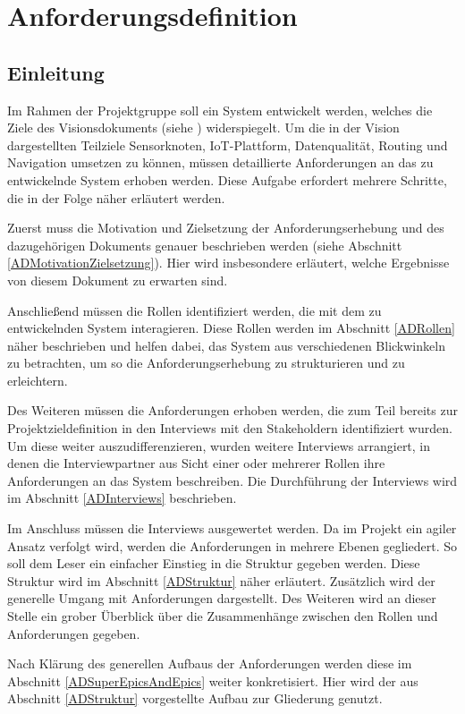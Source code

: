 \chapter{Anforderungsdefinition}\label{AD}
\section{Einleitung}\label{ADEinleitung}
Im Rahmen der Projektgruppe soll ein System entwickelt werden, welches die Ziele des Visionsdokuments (siehe ) widerspiegelt. Um die in der Vision dargestellten Teilziele Sensorknoten, IoT-Plattform, Datenqualität, Routing und Navigation umsetzen zu können, müssen detaillierte Anforderungen an das zu entwickelnde System erhoben werden. Diese Aufgabe erfordert mehrere Schritte, die in der Folge näher erläutert werden.

Zuerst muss die Motivation und Zielsetzung der Anforderungserhebung und des dazugehörigen Dokuments genauer beschrieben werden (siehe Abschnitt \ref{ADMotivationZielsetzung}). Hier wird insbesondere erläutert, welche Ergebnisse von diesem Dokument zu erwarten sind.

Anschließend müssen die Rollen identifiziert werden, die mit dem zu entwickelnden System interagieren. Diese Rollen werden im Abschnitt \ref{ADRollen} näher beschrieben und helfen dabei, das System aus verschiedenen Blickwinkeln zu betrachten, um so die Anforderungserhebung zu strukturieren und zu erleichtern.

Des Weiteren müssen die Anforderungen erhoben werden, die zum Teil bereits zur Projektzieldefinition in den Interviews mit den Stakeholdern identifiziert wurden. Um diese weiter auszudifferenzieren, wurden weitere Interviews arrangiert, in denen die Interviewpartner aus Sicht einer oder mehrerer Rollen ihre Anforderungen an das System beschreiben. Die Durchführung der Interviews wird im Abschnitt \ref{ADInterviews} beschrieben.

Im Anschluss müssen die Interviews ausgewertet werden. Da im Projekt ein agiler Ansatz verfolgt wird, werden die Anforderungen in mehrere Ebenen gegliedert. So soll dem Leser ein einfacher Einstieg in die Struktur gegeben werden. Diese Struktur wird im Abschnitt \ref{ADStruktur} näher erläutert. Zusätzlich wird der generelle Umgang mit Anforderungen dargestellt. Des Weiteren wird an dieser Stelle ein grober Überblick über die Zusammenhänge zwischen den Rollen und Anforderungen gegeben. 

Nach Klärung des generellen Aufbaus der Anforderungen werden diese im Abschnitt \ref{ADSuperEpicsAndEpics} weiter konkretisiert. Hier wird der aus Abschnitt \ref{ADStruktur} vorgestellte Aufbau zur Gliederung genutzt.

